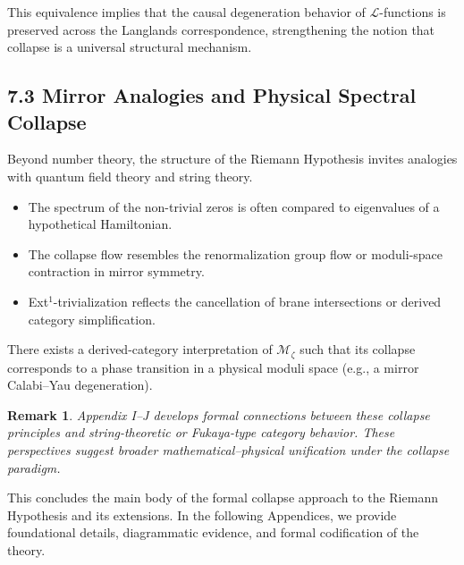 \documentclass[11pt]{article}
\newtheorem{remark}[theorem]{Remark}
\begin{document}
This equivalence implies that the causal degeneration behavior of $\mathcal{L}$-functions is preserved across the Langlands correspondence,  
strengthening the notion that collapse is a universal structural mechanism.

\subsection{7.3 Mirror Analogies and Physical Spectral Collapse}

Beyond number theory, the structure of the Riemann Hypothesis invites analogies with quantum field theory and string theory.

\begin{itemize}
    \item The spectrum of the non-trivial zeros is often compared to eigenvalues of a hypothetical Hamiltonian.
    \item The collapse flow resembles the renormalization group flow or moduli-space contraction in mirror symmetry.
    \item Ext$^1$-trivialization reflects the cancellation of brane intersections or derived category simplification.
\end{itemize}

\begin{conjecture}
There exists a derived-category interpretation of $\mathcal{M}_\zeta$ such that its collapse corresponds to a phase transition in a physical moduli space  
(e.g., a mirror Calabi–Yau degeneration).
\end{conjecture}

\begin{remark}
Appendix I–J develops formal connections between these collapse principles and string-theoretic or Fukaya-type category behavior.  
These perspectives suggest broader mathematical–physical unification under the collapse paradigm.
\end{remark}

This concludes the main body of the formal collapse approach to the Riemann Hypothesis and its extensions.  
In the following Appendices, we provide foundational details, diagrammatic evidence, and formal codification of the theory.




\appendix
\end{document}
